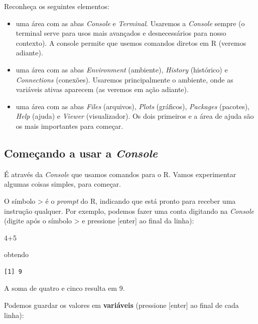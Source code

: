 \documentclass[
]{article}
\newenvironment{Shaded}{\begin{snugshade}}{\end{snugshade}}
\newcommand{\DecValTok}[1]{\textcolor[rgb]{0.00,0.00,0.81}{#1}}
\newcommand{\SpecialCharTok}[1]{\textcolor[rgb]{0.00,0.00,0.00}{#1}}
\providecommand{\tightlist}{%
  \setlength{\itemsep}{0pt}\setlength{\parskip}{0pt}}
\begin{document}
Reconheça os seguintes elementos:

\begin{itemize}
\tightlist
\item
  uma área com as abas \emph{Console} e \emph{Terminal}. Usaremos a
  \emph{Console} sempre (o terminal serve para usos mais avançados e
  desnecessários para nosso contexto). A console permite que usemos
  comandos diretos em R (veremos adiante).
\item
  uma área com as abas \emph{Environment} (ambiente), \emph{History}
  (histórico) e \emph{Connections} (conexões). Usaremos principalmente o
  ambiente, onde as variáveis ativas aparecem (as veremos em ação
  adiante).
\item
  uma área com as abas \emph{Files} (arquivos), \emph{Plots} (gráficos),
  \emph{Packages} (pacotes), \emph{Help} (ajuda) e \emph{Viewer}
  (visualizador). Os dois primeiros e a área de ajuda são os mais
  importantes para começar.
\end{itemize}

\hypertarget{comeuxe7ando-a-usar-a-console}{%
\subsection{\texorpdfstring{Começando a usar a
\emph{Console}}{Começando a usar a Console}}\label{comeuxe7ando-a-usar-a-console}}

É através da \emph{Console} que usamos comandos para o R. Vamos
experimentar algumas coisas simples, para começar.

O símbolo \textgreater{} é o \emph{prompt} do R, indicando que está
pronto para receber uma instrução qualquer. Por exemplo, podemos fazer
uma conta digitando na \emph{Console} (digite após o símbolo
\textgreater{} e pressione {[}enter{]} ao final da linha):

\begin{Shaded}
\begin{Highlighting}[]
\DecValTok{4}\SpecialCharTok{+}\DecValTok{5}
\end{Highlighting}
\end{Shaded}

obtendo

\begin{verbatim}
[1] 9
\end{verbatim}

A soma de quatro e cinco resulta em 9.

Podemos guardar os valores em \textbf{variáveis} (pressione {[}enter{]}
ao final de cada linha):
\end{document}
